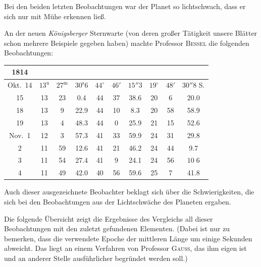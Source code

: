\par\indent Bei den beiden letzten Beobachtungen war der Planet so lichtschwach, dass er sich nur mit Mühe erkennen ließ.

\par\indent An der neuen \emph{Königsberger} Sternwarte (von deren großer Tätigkeit unsere Blätter schon mehrere Beispiele gegeben haben) machte Professor \textsc{Bessel} die folgenden Beobachtungen:

\begin{center}\fontsize{9}{11}\selectfont\setlength{\tabcolsep}{3pt}\renewcommand{\arraystretch}{1.15}\begin{tabular}{c|ccc|ccc|ccc}
1814 &  &  &  \\
\hline
Okt.\ 14 & $13^{\mathrm u}$ & $27^{\mathrm m}$ & $30^{\mathrm s}6$ & $44^{\circ}$ & $46'$ & $15''3$ & $19^{\circ}$ & $48'$ & $30''8$ S. \\
15         & 13 & 23 & 0.4  & 44 & 37 & 38.6 & 20 & 6  & 20.0 \\
18         & 13 & 9  & 22.9 & 44 & 10 & 8.3  & 20 & 58 & 58.9 \\
19         & 13 & 4  & 48.3 & 44 & 0  & 25.9 & 21 & 15 & 52.6 \\
Nov.\ 1    & 12 & 3  & 57.3 & 41 & 33 & 59.9 & 24 & 31 & 29.8 \\
2          & 11 & 59 & 12.6 & 41 & 21 & 46.2 & 24 & 44 & 9.7  \\
3          & 11 & 54 & 27.4 & 41 & 9  & 24.1 & 24 & 56 & $10\;6$ \\
4          & 11 & 49 & 42.0 & 40 & 56 & 59.6 & 25 & 7  & 41.8 \\
\end{tabular}\end{center}

\par\indent Auch dieser ausgezeichnete Beobachter beklagt sich über die Schwierigkeiten, die sich bei den Beobachtungen aus der Lichtschwäche des Planeten ergaben.

\par\indent Die folgende Übersicht zeigt die Ergebnisse des Vergleichs all dieser Beobachtungen mit den zuletzt gefundenen Elementen. (Dabei ist nur zu bemerken, dass die verwendete Epoche der mittleren Länge um einige Sekunden abweicht. Das liegt an einem Verfahren von Professor \textsc{Gauss}, das ihm eigen ist und an anderer Stelle ausführlicher begründet werden soll.)

